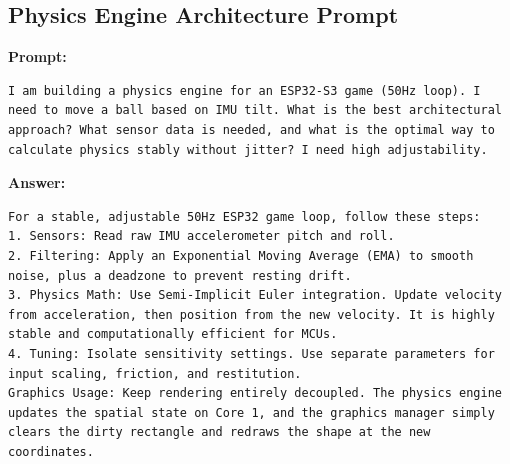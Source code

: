 \subsection*{Physics Engine Architecture Prompt}
\textbf{Prompt:}
\begin{lstlisting}[language={}, breaklines=true]
I am building a physics engine for an ESP32-S3 game (50Hz loop). I need to move a ball based on IMU tilt. What is the best architectural approach? What sensor data is needed, and what is the optimal way to calculate physics stably without jitter? I need high adjustability.
\end{lstlisting}
\textbf{Answer:}
\begin{lstlisting}[language={}, breaklines=true]
For a stable, adjustable 50Hz ESP32 game loop, follow these steps:
1. Sensors: Read raw IMU accelerometer pitch and roll.
2. Filtering: Apply an Exponential Moving Average (EMA) to smooth noise, plus a deadzone to prevent resting drift.
3. Physics Math: Use Semi-Implicit Euler integration. Update velocity from acceleration, then position from the new velocity. It is highly stable and computationally efficient for MCUs.
4. Tuning: Isolate sensitivity settings. Use separate parameters for input scaling, friction, and restitution.
Graphics Usage: Keep rendering entirely decoupled. The physics engine updates the spatial state on Core 1, and the graphics manager simply clears the dirty rectangle and redraws the shape at the new coordinates.
\end{lstlisting}